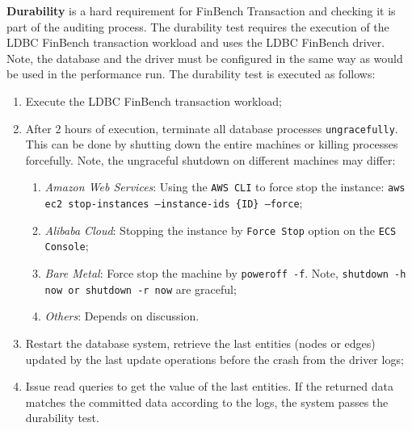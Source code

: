 {\bf Durability} is a hard requirement for FinBench Transaction and checking it 
is part of the auditing process. The durability test requires the execution of 
the LDBC FinBench transaction workload and uses the LDBC FinBench driver. Note, 
the database and the driver must be configured in the same way as would be used 
in the performance run. The durability test is executed as follows:

\begin{enumerate}[label={(\roman*)}]
  \item Execute the LDBC FinBench transaction workload;
  \item After 2 hours of execution, terminate all database processes 
        \texttt{ungracefully}. This can be done by shutting down the entire 
        machines or killing processes forcefully. Note, the ungraceful shutdown
        on different machines may differ:
        \begin{enumerate}[label={(\alph*)}]
          \item \emph{Amazon Web Services}: Using the \texttt{AWS CLI} to force 
                stop the instance: 
                \texttt{aws ec2 stop-instances --instance-ids \{ID\} --force};
          \item \emph{Alibaba Cloud}: Stopping the instance by \texttt{Force Stop}
                option on the \texttt{ECS Console};
          \item \emph{Bare Metal}: Force stop the machine by \texttt{poweroff -f}.
                Note, \texttt{shutdown -h now or shutdown -r now} are graceful;
          \item \emph{Others}: Depends on discussion.
        \end{enumerate}
  \item Restart the database system, retrieve the last entities (nodes or edges)
        updated by the last update operations before the crash from the driver 
        logs;
  \item Issue read queries to get the value of the last entities. If the returned 
        data matches the committed data according to the logs, the system
        passes the durability test.
\end{enumerate}

